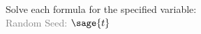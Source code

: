 \documentclass{article}%
\begin{document}

\noindent Solve each formula for the specified variable: \\
\textcolor{gray}{Random Seed: $\sage{t}$}


\begin{multicols}{3}
\begin{enumerate}
\end{enumerate}
\end{multicols}


\vfill
\newpage


\begin{multicols}{3}
\begin{enumerate}
\end{enumerate}
\end{multicols}
\end{document}
